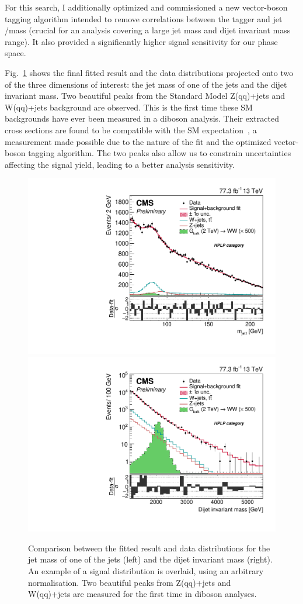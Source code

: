 \documentclass{pasa}%
\begin{document}
For this search, I additionally optimized and commissioned a new vector-boson tagging algorithm intended to remove correlations between the tagger and jet \PT/mass (crucial for an analysis covering a large jet mass and dijet invariant mass range). It also provided a significantly higher signal sensitivity for our phase space.

Fig.~\ref{Fig6} shows the final fitted result and the data distributions projected onto two of the three dimensions of interest: the jet mass of one of the jets and the dijet invariant mass. Two beautiful peaks from the Standard Model Z(qq)+jets and W(qq)+jets background are observed. This is the first time these SM backgrounds have ever been measured in a diboson analysis. Their extracted cross sections are found to be compatible with the SM expectation~\cite{CMS-PAS-B2G-18-002}, a measurement made possible due to the nature of the fit and the optimized vector-boson tagging algorithm. The two peaks also allow us to constrain uncertainties affecting the signal yield, leading to a better analysis sensitivity.
\begin{figure}[h!]
\centering
 \includegraphics[width=0.49\columnwidth]{figures/PostFitComboHPLP_X-Proj__y___0_-1_z___0_-1_prelim.pdf}
\includegraphics[width=0.49\columnwidth]{figures/PostFitComboHPLP_Z-Proj__x___0_-1_y___0_-1_prelim.pdf}
\caption{Comparison between the fitted result and data distributions for the jet mass of one of the jets (left) and the dijet invariant mass (right).  An example of a signal distribution is overlaid, using an arbitrary normalisation. Two beautiful peaks from Z(qq)+jets and W(qq)+jets are measured for the first time in diboson analyses.}
\label{Fig6}
\end{figure}
\end{document}
